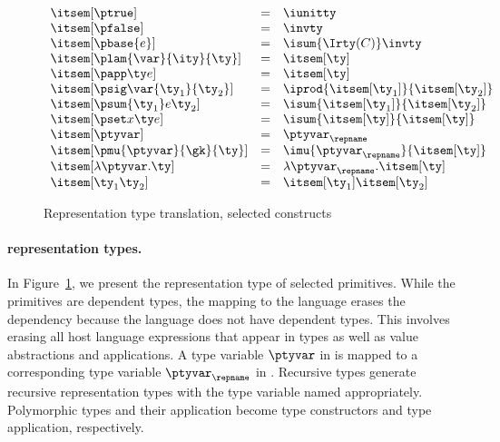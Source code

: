 {\begin{figure}
\fbox{$\itsem[\ty] = \ity$}
\[
\begin{array}{lcl} 
\itsem[\ptrue] & = & \iunitty \\
\itsem[\pfalse] & = & \invty \\
\itsem[\pbase{e}] & = & \isum {\Irty(C)} \invty   \\
\itsem[\plam{\var}{\ity}{\ty}] & = & \itsem[\ty] \\
\itsem[\papp \ty e] & = & \itsem[\ty] \\
\itsem[\psig \var {\ty_1} {\ty_2}]  & = & \iprod {\itsem[\ty_1]} {\itsem[\ty_2]}    \\
\itsem[\psum {\ty_1} e {\ty_2}]     & = & \isum {\itsem[\ty_1]} {\itsem[\ty_2]} \\
\itsem[\pset x \ty e] & = & \isum {\itsem[\ty]}{\itsem[\ty]}\\
\itsem[\ptyvar] & = & \ptyvar_\repname \\
\itsem[\pmu{\ptyvar}{\gk}{\ty}] & = & \imu{\ptyvar_\repname}{\itsem[\ty]} \\
\itsem[\lambda \ptyvar.\ty]       & = & \lambda \ptyvar_\repname.\itsem[\ty] \\
\itsem[\ty_1 \ty_2]              & = & \itsem[\ty_1] \itsem[\ty_2] \\
\end{array}
\]
\caption{Representation type translation, selected constructs}
\label{fig:rep-tys}
\end{figure}


\paragraph*{\ddc{} representation types.}
\label{sec:intty-sem}
In Figure~\ref{fig:rep-tys}, we present the representation type
of selected \ddc{} primitives. While the primitives are
dependent types, the mapping to the \implang{} language 
erases the dependency because the \implang{} language 
does not have dependent types. This involves erasing all host language
expressions that appear in types as well as 
value abstractions and applications.
A type variable $\ptyvar$ in \ddc{} is mapped to a corresponding
type variable $\ptyvar_\repname$ in \fomega{}.
Recursive types generate recursive representation types with the type
variable named appropriately. Polymorphic types and their application 
become \fomega{} type constructors and type application, respectively.

}
